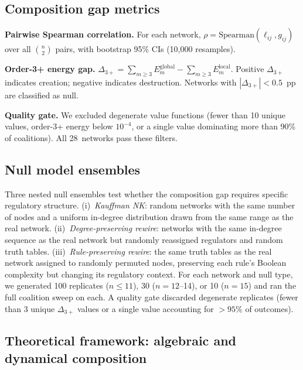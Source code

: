 \documentclass[10pt]{article}
\begin{document}
\subsection{Composition gap metrics}
\label{sec:metrics}

\textbf{Pairwise Spearman correlation.}
For each network, $\rho = \mathrm{Spearman}(\ell_{ij}, g_{ij})$ over
all $\binom{n}{2}$ pairs, with bootstrap 95\% CIs (10{,}000
resamples).

\textbf{Order-3+ energy gap.}
$\Delta_{3+} = \sum_{m \geq 3} E_m^{\mathrm{global}}
- \sum_{m \geq 3} E_m^{\mathrm{local}}.$
Positive $\Delta_{3+}$ indicates creation; negative indicates
destruction. Networks with $|\Delta_{3+}| < 0.5$~pp are classified as
null.

\textbf{Quality gate.}
We excluded degenerate value functions (fewer than 10 unique values,
order-3+ energy below $10^{-4}$, or a single value dominating more
than 90\% of coalitions). All 28~networks pass these filters.


\subsection{Null model ensembles}
\label{sec:null-models}

Three nested null ensembles test whether the composition gap requires
specific regulatory structure. (i)~\emph{Kauffman NK}: random
networks with the same number of nodes and a uniform in-degree
distribution drawn from the same range as the real network.
(ii)~\emph{Degree-preserving rewire}: networks with the same
in-degree sequence as the real network but randomly reassigned
regulators and random truth tables. (iii)~\emph{Rule-preserving
rewire}: the same truth tables as the real network assigned to
randomly permuted nodes, preserving each rule's Boolean complexity
but changing its regulatory context. For each network and null type,
we generated 100 replicates ($n \leq 11$), 30 ($n = 12$--14), or 10
($n = 15$) and ran the full coalition sweep on each. A quality gate
discarded degenerate replicates (fewer than 3 unique $\Delta_{3+}$
values or a single value accounting for $> 95\%$ of outcomes).


\subsection{Theoretical framework: algebraic and dynamical composition}
\label{sec:theory}
\end{document}
